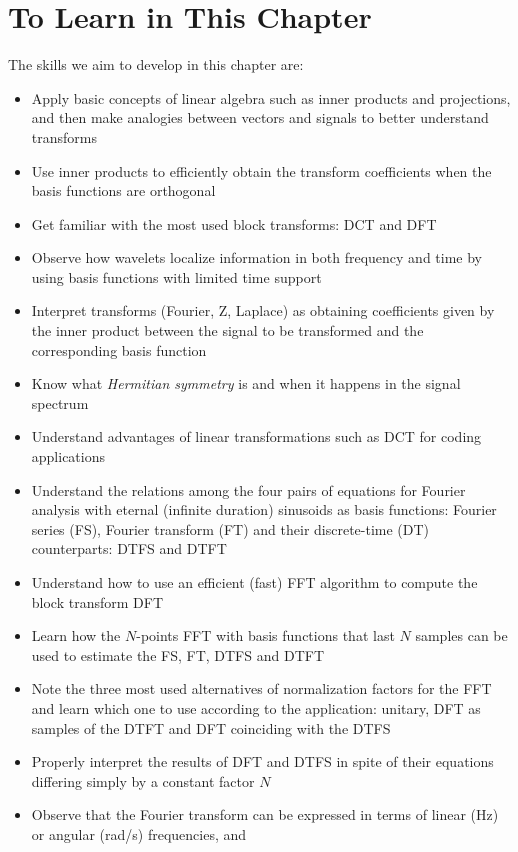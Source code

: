 \section{To Learn in This Chapter}

The skills we aim to develop in this chapter are:
\begin{itemize}
        \item Apply basic concepts of linear algebra such as inner products and projections, and then make analogies
				between vectors and signals to better understand transforms
        \item Use inner products to efficiently obtain the transform coefficients when the basis functions are orthogonal
				\item Get familiar with the most used block transforms: DCT and DFT
				\item Observe how wavelets localize information in both frequency and time by using basis functions with 
				limited time support				
        \item Interpret transforms (Fourier, Z, Laplace) as obtaining coefficients given by the inner product between the signal to be transformed and the corresponding basis function
				\item Know what \emph{Hermitian symmetry} is and when it happens in the signal spectrum
        \item Understand advantages of linear transformations such as DCT for coding applications
				\item Understand the relations among the four pairs of equations for Fourier analysis with eternal (infinite duration) sinusoids as basis functions: Fourier series (FS), Fourier transform (FT) and their discrete-time (DT) counterparts: DTFS and DTFT
				\item Understand how to use an efficient (fast) FFT algorithm to compute the block transform DFT
				\item Learn how the $N$-points FFT with basis functions that last $N$ samples can be used to estimate
				the FS, FT, DTFS and DTFT
				\item Note the three most used alternatives of normalization factors for the FFT and learn which one to use according to the application: unitary, DFT as samples of the DTFT and DFT coinciding with the DTFS
				\item Properly interpret the results of DFT and DTFS in spite of their equations differing simply by a constant factor $N$
				\item Observe that the Fourier transform can be expressed in terms of linear (Hz) or angular (rad/s) frequencies, and

\end{itemize}
